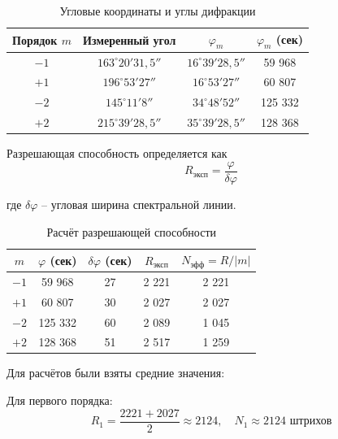 \documentclass[12pt,a4paper]{article}
\begin{document}
\begin{table}[H]
\centering

\begin{tabular}{|c|c|c|c|}
\hline
Порядок $m$ & Измеренный угол & $\varphi_m$ & $\varphi_m$ (сек) \\
\hline
$-1$ & $163^\circ 20' 31{,}5''$ & $16^\circ 39' 28{,}5''$ & 59 968 \\
\hline
$+1$ & $196^\circ 53' 27''$ & $16^\circ 53' 27''$ & 60 807 \\
\hline
$-2$ & $145^\circ 11' 8''$ & $34^\circ 48' 52''$ & 125 332 \\
\hline
$+2$ & $215^\circ 39' 28{,}5''$ & $35^\circ 39' 28{,}5''$ & 128 368 \\
\hline
\end{tabular}
\caption{Угловые координаты и углы дифракции}
\end{table}


Разрешающая способность определяется как
\begin{equation}
    R_{\text{эксп}} = \frac{\varphi}{\delta\varphi}
\end{equation}

где $\delta\varphi$ -- угловая ширина спектральной линии.

\begin{table}[H]
\centering

\begin{tabular}{|c|c|c|c|c|}
\hline
$m$ & $\varphi$ (сек) & $\delta\varphi$ (сек) & $R_{\text{эксп}}$ & $N_{\text{эфф}} = R/|m|$ \\
\hline
$-1$ & 59 968 & 27 & 2 221 & 2 221 \\
\hline
$+1$ & 60 807 & 30 & 2 027 & 2 027 \\
\hline
$-2$ & 125 332 & 60 & 2 089 & 1 045 \\
\hline
$+2$ & 128 368 & 51 & 2 517 & 1 259 \\
\hline
\end{tabular}
\caption{Расчёт разрешающей способности}
\end{table}

Для расчётов были взяты средние значения:

Для первого порядка:
\begin{equation}
    R_1 = \frac{2221 + 2027}{2} \approx 2124, \quad 
    N_1 \approx 2124 \text{ штрихов}
\end{equation}
\end{document}
